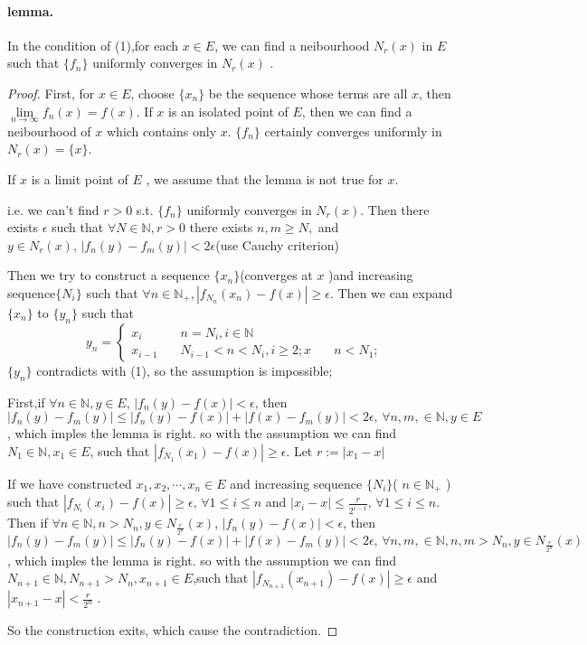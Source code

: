 \documentclass{article}
\begin{document}
\paragraph{lemma.} In the condition of (1),for each  $ x\in E $, we can find a neibourhood  $ N_r(x) $ in  $ E  $ such that  $ \{f_n \} $ 
 uniformly converges in  $ N_r(x) $ .
 \begin{proof}
    First, for  $ x\in E   $, choose  $ \{x_n\} $ be the sequence whose terms are all  $ x $, then  $ \lim\limits_{n\to\infty} f_n(x)=f(x)  $.
    If  $ x  $ is  an isolated point of  $ E  $, then we can find a neibourhood of  $ x $ which contains only  $ x $.  $ \{f_n\} $  certainly converges uniformly in $ N_r(x)=\{x\} $.

    If  $ x $ is a limit point of  $ E  $ , we assume that the lemma is not true for  $ x $.

    i.e. we can't find  $ r>0 $ s.t. $ \{f_n \} $ uniformly converges in  $ N_r(x) $. Then there exists  $ \epsilon $ such that $\forall N\in\mathbb{N },r>0  $ there exists $n,m\geqslant N, $ and  $ y\in N_r(x),\,  |f_n(y)-f_m(y)|< 2\epsilon  $(use Cauchy criterion)

    Then  we try to construct a sequence  $ \{x_n\} $(converges at  $ x $ )and  increasing sequence$ \{N_i\} $  such that   $\forall n\in \mathbb{N}_+,  |f_{N_n}(x_n)-f(x)|\geqslant \epsilon  $.
    Then we can expand  $ \{x_n \} $  to $ \{y_n \} $ such that 
    \begin{equation*}
        y_n=\left\{
            \begin{aligned}
                x_i&{}\quad n=N_i,i\in \mathbb{N}\\
                x_{i-1}&{}\quad N_{i-1}<n<N_{i},i\geqslant 2;
                x&{}\quad n<N_{1};
            \end{aligned}
        \right.
    \end{equation*} 
     $ \{y_n\} $  contradicts with (1), so the assumption is impossible;

    First,if  $ \forall n\in\mathbb{N},y\in E $,  $ |f_n(y)-f(x)|<\epsilon $, then  $ |f_n(y)-f_m(y)| \leqslant |f_n(y)-f(x)|+|f(x)-f_m(y)|<2\epsilon,\,\forall n,m,\in\mathbb{N},y\in E $, which imples the lemma is right.
    so with the assumption we can find  $ N_1\in\mathbb{N },x_1\in E $, such that   $ |f_{N_1}(x_1)-f(x)|\geqslant \epsilon $. Let  $ r:=|x_1-x| $ 

    If   we have constructed  $ x_1,x_2,\cdots,x_n \in E$ and increasing sequence $ \{N_i\} $( $ n\in \mathbb{N}_+ $ ) such that  $ |f_{N_i}(x_i)-f(x)|\geqslant \epsilon,\,\forall 1 \leqslant i \leqslant n  $ and  $ |x_{i}-x| \leqslant \frac{r}{2^{i-1}},\,\forall 1 \leqslant i \leqslant n $.  
    Then if  $ \forall n\in\mathbb{N},n>N_n,y\in N_{\frac{r}{2^n}}(x) $,  $ |f_n(y)-f(x)|<\epsilon $, then  $ |f_n(y)-f_m(y)| \leqslant |f_n(y)-f(x)|+|f(x)-f_m(y)|<2\epsilon,\,\forall n,m,\in\mathbb{N},n,m>N_n,y\in N_{\frac{r}{2^n}}(x) $, which imples the lemma is right.
    so with the assumption we can find  $ N_{n+1}\in\mathbb{N },N_{n+1}>N_n,x_{n+1}\in E $,such that  $ |f_{N_{n+1}}(x_{n+1})-f(x)|\geqslant \epsilon $ and  $ |x_{n+1}-x|<\frac{r}{2^n} $ .

    So the construction exits, which cause the contradiction.
 \end{proof} 
\end{document}
